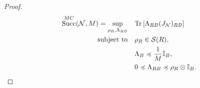 \documentclass[10pt,a4paper]{amsart}
\DeclareMathOperator{\suc}{Succ}
\newcommand*{\cN}{\mathcal{N}}
\newcommand*{\cS}{\mathcal{S}}
\newcommand*{\mle}{\preccurlyeq}
\newcommand*{\tr}[1]{\mathrm{Tr}\left[#1\right]}
\begin{document}
\begin{proof}
\begin{align}
    \suc^{\rm{MC}}(\cN, M) = \sup_{\rho_R, \Lambda_{RB}} \quad & \tr{\Lambda_{RB} (J_{\cN})_{RB}} \notag \\
\text{subject to} \quad
& \rho_R \in \cS(R), \notag \\
& \Lambda_B \mle   \frac{1}{M} \mathbb{I}_B, \notag \\
& 0 \mle \Lambda_{RB} \mle  \rho_R \otimes \mathbb{I}_B.
\end{align}
\end{proof}
\end{document}
